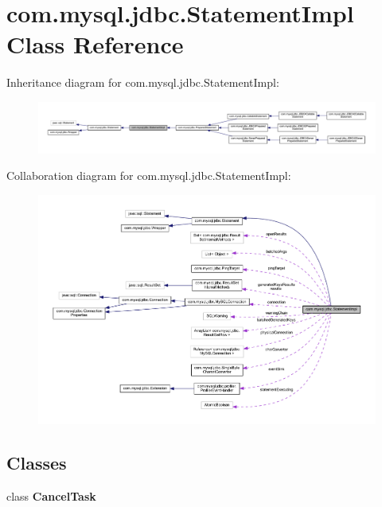 \hypertarget{classcom_1_1mysql_1_1jdbc_1_1_statement_impl}{}\section{com.\+mysql.\+jdbc.\+Statement\+Impl Class Reference}
\label{classcom_1_1mysql_1_1jdbc_1_1_statement_impl}


Inheritance diagram for com.\+mysql.\+jdbc.\+Statement\+Impl\+:
\nopagebreak
\begin{figure}[H]
\begin{center}
\leavevmode
\includegraphics[width=350pt]{classcom_1_1mysql_1_1jdbc_1_1_statement_impl__inherit__graph}
\end{center}
\end{figure}


Collaboration diagram for com.\+mysql.\+jdbc.\+Statement\+Impl\+:
\nopagebreak
\begin{figure}[H]
\begin{center}
\leavevmode
\includegraphics[width=350pt]{classcom_1_1mysql_1_1jdbc_1_1_statement_impl__coll__graph}
\end{center}
\end{figure}
\subsection*{Classes}
\begin{DoxyCompactItemize}
\item 
class {\bfseries Cancel\+Task}
\end{DoxyCompactItemize}
